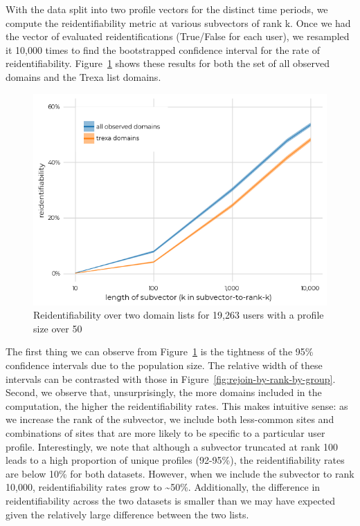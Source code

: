 \documentclass[letterpaper,twocolumn,10pt]{article}
\begin{document}
With the data split into two profile vectors for the distinct time periods, we compute the reidentifiability metric at various subvectors of rank k.  
Once we had the vector of evaluated reidentifications (True/False for each user), we resampled it 10,000 times to find the bootstrapped confidence interval for the rate of reidentifiability. Figure~\ref{fig:rejoin-sall50plus} shows these results for both the set of all observed domains and the Trexa list domains.
%
\begin{figure}[htbp]
    \centering
    \includegraphics[width=0.9\linewidth]{figures/4-c2-2-rejoinability-by-rank-trexa-pioneer-50plus.png}
    \caption{Reidentifiability over two domain lists for 19,263 users with a profile size over 50}
    \label{fig:rejoin-sall50plus}
\end{figure}
%
The first thing we can observe from Figure~\ref{fig:rejoin-sall50plus} is the tightness of the 95\% confidence intervals due to the population size. The relative width of these intervals can be contrasted with those in Figure~\ref{fig:rejoin-by-rank-by-group}.  
Second, we observe that, unsurprisingly, the more domains  included in the computation, the higher the reidentifiability rates.
This makes intuitive sense: as we increase the rank of the subvector, we include both less-common sites and combinations of sites that are more likely to be specific to a particular user profile.
Interestingly, we note that although a subvector truncated at rank 100 leads to a high proportion of unique profiles (92-95\%), the reidentifiability rates are below 10\% for both datasets. However, when we include the subvector to rank 10,000, reidentifiability rates grow to \textasciitilde{}50\%. 
Additionally, the difference in reidentifiability across the two datasets is smaller than we may have expected given the relatively large difference between the two lists.
\end{document}

